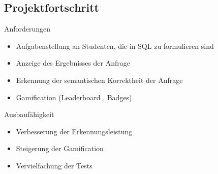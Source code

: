 \subsection{Projektfortschritt}

\begin{frame}{\insertsectionhead}{\insertsubsectionhead}
  \begin{block}{Anforderungen}
    \begin{itemize}
      \item Aufgabenstellung an Studenten, die in SQL zu formulieren sind \only<+->{\done}
      \item Anzeige des Ergebnisses der Anfrage \only<+->{\done}
      \item Erkennung der semantischen Korrektheit der Anfrage \only<+->{\done}
      \item Gamification (Leaderboard \only<+->{\done}, Badges) 
    \end{itemize}
  \end{block}

  \pause

  \begin{block}{Ausbaufähigkeit}
    \begin{itemize}
      \item Verbesserung der Erkennungsleistung
      \item Steigerung der Gamification
      \item Vervielfachung der Tests
    \end{itemize}
  \end{block}
\end{frame}

